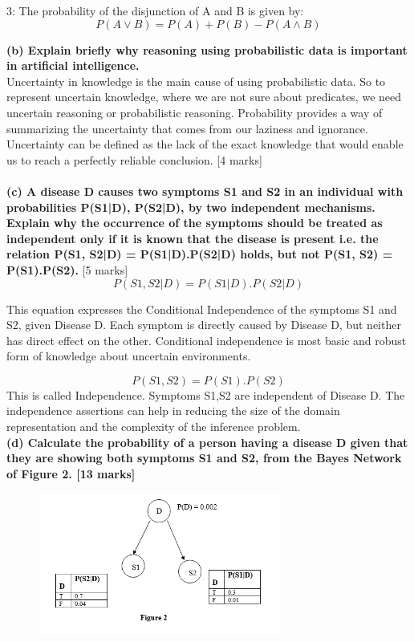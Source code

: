 \documentclass[12pt,a4paper]{article}
\begin{document}
    3: The probability of the disjunction of A and B is given by:
  \begin{equation*}
  P(A \lor B) = P(A) + P(B) - P(A \land B)
  \end{equation*}
    

	\textbf{(b)	Explain briefly why reasoning using probabilistic data is important in artificial intelligence.}\\
	Uncertainty in knowledge  is the main cause of using probabilistic data. So to represent uncertain knowledge, where we are not sure about predicates, we need uncertain reasoning or probabilistic reasoning. Probability provides a way of summarizing the uncertainty that comes from our laziness
	and ignorance. Uncertainty can be defined as the lack of the exact knowledge that would enable
	us to reach a perfectly reliable conclusion.
	[4 marks]\\
	\\
	\textbf{(c)	A disease D causes two symptoms S1 and S2 in an individual with probabilities P(S1|D), P(S2|D), by two independent mechanisms. Explain why the occurrence of the symptoms should be treated as independent only if it is known that the disease is present i.e. the relation P(S1, S2|D) = P(S1|D).P(S2|D) holds, but not P(S1, S2) = P(S1).P(S2).}
	[5 marks]\\
	
	
	\begin{equation*}
	P(S1,S2|D) = P(S1|D).P(S2|D)
	\end{equation*}
	
	This equation expresses the Conditional Independence of the symptoms S1 and S2, given Disease D. Each symptom is directly caused by
	Disease D, but neither has direct effect on the other. Conditional independence is most basic and robust form of knowledge about uncertain environments.
	
	


	
	\begin{equation*}
	P(S1,S2)=P(S1).P(S2)
	\end{equation*}
	This is called Independence. Symptoms S1,S2 are independent of Disease D. The independence assertions can help in reducing
	the size of the domain representation and the complexity of the inference problem.
	\\
	
	
	\textbf{(d)	Calculate the probability of a person having a disease D given that they are showing both symptoms S1 and S2, from the Bayes Network of Figure 2.
	[13 marks]}
\begin{figure}[h]
\includegraphics[width=80mm]{q6.png}
\end{figure}
\end{document}
